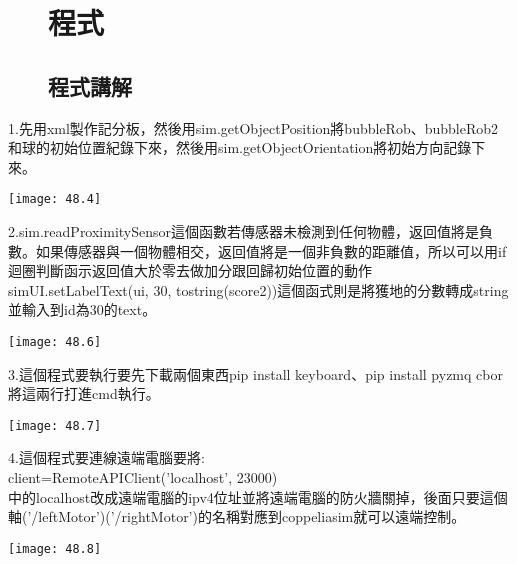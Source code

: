 \newpage
\begin{figure}[hbt!]
\chapter{程式}
\section{程式講解}
\end{figure}
1.先用xml製作記分板，然後用sim.getObjectPosition將bubbleRob、bubbleRob2和球的初始位置紀錄下來，然後用sim.getObjectOrientation將初始方向記錄下來。
\begin{center}
\texttt{[image: 48.4]}
\end{center}

2.sim.readProximitySensor這個函數若傳感器未檢測到任何物體，返回值將是負數。如果傳感器與一個物體相交，返回值將是一個非負數的距離值，所以可以用if迴圈判斷函示返回值大於零去做加分跟回歸初始位置的動作
simUI.setLabelText(ui, 30, tostring(score2))這個函式則是將獲地的分數轉成string並輸入到id為30的text。
\begin{center}
\texttt{[image: 48.6]}
\end{center}
\newpage
3.這個程式要執行要先下載兩個東西pip install keyboard、pip install pyzmq cbor將這兩行打進cmd執行。
\begin{center}
\texttt{[image: 48.7]}
\end{center}

4.這個程式要連線遠端電腦要將:\\
client=RemoteAPIClient('localhost', 23000)\\
中的localhost改成遠端電腦的ipv4位址並將遠端電腦的防火牆關掉，後面只要這個軸('/leftMotor')('/rightMotor')的名稱對應到coppeliasim就可以遠端控制。
\begin{center}
\texttt{[image: 48.8]}
\end{center}